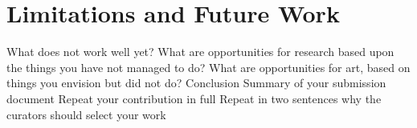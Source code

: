 \documentclass{sigchi-ext}
\begin{document}
\section{Limitations and Future Work}

What does not work well yet?
What are opportunities for research based upon the things you have not managed to do?
What are opportunities for art, based on things you envision but did not do?
Conclusion
Summary of your submission document
Repeat your contribution in full
Repeat in two sentences why the curators should select your work

\balance{}



\end{document}
